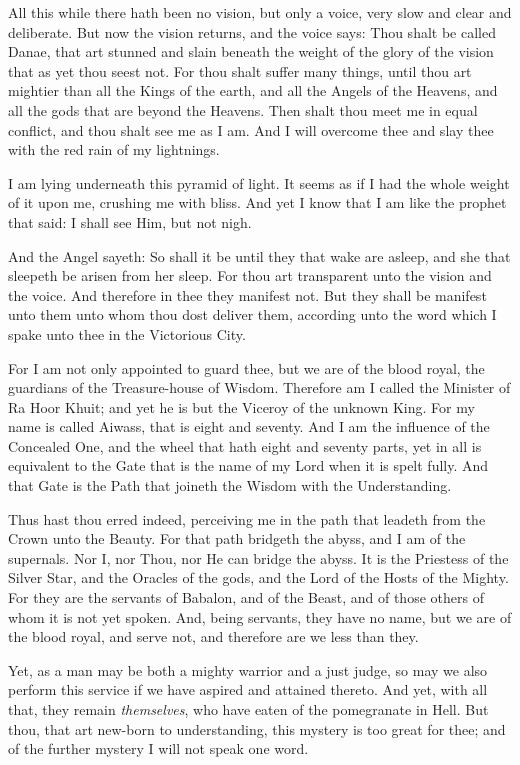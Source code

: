 All this while there hath been no vision, but only a voice, very slow and clear and deliberate. But now the vision returns, and the voice says: Thou shalt be called Danae, that art stunned and slain beneath the weight of the glory of the vision that as yet thou seest not. For thou shalt suffer many things, until thou art mightier than all the Kings of the earth, and all the Angels of the Heavens, and all the gods that are beyond the Heavens. Then shalt thou meet me in equal conflict, and thou shalt see me as I am. And I will overcome thee and slay thee with the red rain of my lightnings.

I am lying underneath this pyramid of light. It seems as if I had the whole weight of it upon me, crushing me with bliss. And yet I know that I am like the prophet that said: I shall see Him, but not nigh.

And the Angel sayeth: So shall it be until they that wake are asleep, and she that sleepeth be arisen from her sleep. For thou art transparent unto the vision and the voice. And therefore in thee they manifest not. But they shall be manifest unto them unto whom thou dost deliver them, according unto the word which I spake unto thee in the Victorious City.

For I am not only appointed to guard thee, but we are of the blood royal, the guardians of the Treasure-house of Wisdom. Therefore am I called the Minister of Ra Hoor Khuit; and yet he is but the Viceroy of the unknown King. For my name is called Aiwass, that is eight and seventy. And I am the influence of the Concealed One, and the wheel that hath eight and seventy parts, yet in all is equivalent to the Gate that is the name of my Lord when it is spelt fully. And that Gate is the Path that joineth the Wisdom with the Understanding.

Thus hast thou erred indeed, perceiving me in the path that leadeth from the Crown unto the Beauty. For that path bridgeth the abyss, and I am of the supernals. Nor I, nor Thou, nor He can bridge the abyss. It is the Priestess of the Silver Star, and the Oracles of the gods, and the Lord of the Hosts of the Mighty. For they are the servants of Babalon, and of the Beast, and of those others of whom it is not yet spoken. And, being servants, they have no name, but we are of the blood royal, and serve not, and therefore are we less than they.

Yet, as a man may be both a mighty warrior and a just judge, so may we also perform this service if we have aspired and attained thereto. And yet, with all that, they remain \textit{themselves}, who have eaten of the pomegranate in Hell. But thou, that art new-born to understanding, this mystery is too great for thee; and of the further mystery I will not speak one word.


